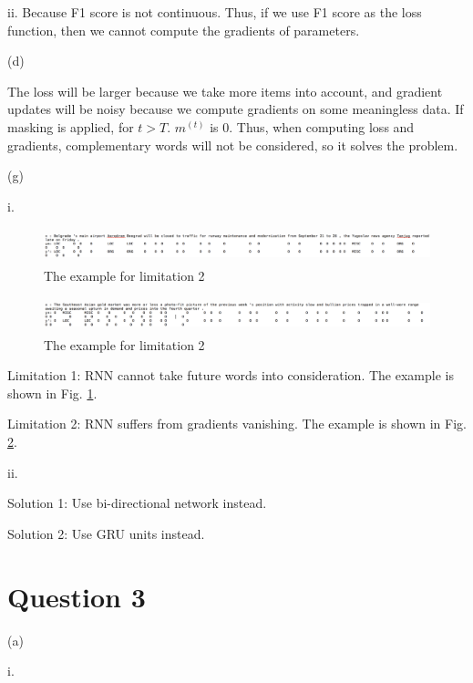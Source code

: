 \documentclass{article}
\theoremstyle{definition}
\theoremstyle{remark}
\numberwithin{equation}{section}
\begin{document}
\vspace{10pt}

ii. Because F1 score is not continuous. Thus, if we use F1 score as the loss function, then we cannot compute the gradients of parameters.

\newpage


(d)

The loss will be larger because we take more items into account, and gradient updates will be noisy because we compute gradients on some meaningless data. If masking is applied, for $t > T$. $m^{(t)}$ is 0. Thus,  when computing loss and gradients, complementary words will not be considered, so it solves the problem.
 
 \newpage
 (g) 
 
 i. 
 
  \begin{figure}[H] 
  \centering
 \includegraphics[width=120mm, height=10mm]{fig/eg3.png}
   \caption{The example for limitation 2}
   \label{fig: eg3}
 \end{figure}
 
  \begin{figure}[H] 
  \centering
 \includegraphics[width=120mm, height=10mm]{fig/eg4.png}
   \caption{The example for limitation 2}
   \label{fig: eg4}
 \end{figure}
 
 
 Limitation 1: RNN cannot take future words into consideration. The example is shown in Fig. \ref{fig: eg3}.
 
 Limitation 2: RNN suffers from gradients vanishing. The example is shown in Fig. \ref{fig: eg4}.
 
 ii.
 
 Solution 1: Use bi-directional network instead.
 
 Solution 2: Use GRU units instead.
 
 
 \newpage
 
 \section{Question 3}
 
 (a) 
 
 i.
 
\end{document}
